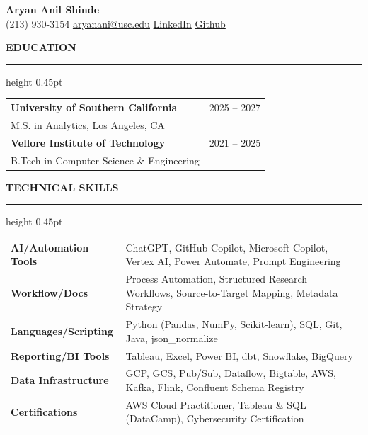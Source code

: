 \documentclass[10pt,letterpaper]{article}
\newcommand{\ressection}[1]{%
  \vspace{2.5pt}
  {\color{sectionblue}\bfseries\MakeUppercase{#1}}\par
  \vspace{1pt}
  {\color{sectionblue}\hrule height 0.45pt}
  \vspace{2pt}
}
\begin{document}
\fontsize{9.05pt}{9.8pt}\selectfont

\begin{center}
  {\fontsize{14.4pt}{15pt}\selectfont \color{sectionblue}\textbf{Aryan Anil Shinde}}\\[-1pt]
  (213) 930-3154 \quad\textbar\quad
  \href{mailto:aryanani@usc.edu}{aryanani@usc.edu} \quad\textbar\quad
  \href{https://linkedin.com/in/aryananilshinde13}{LinkedIn} \quad\textbar\quad
  \href{https://github.com/lefthral}{Github}
\end{center}

\vspace{-5pt}

\ressection{Education}
\begin{tabularx}{\textwidth}{@{}Xr@{}}
  \textbf{University of Southern California} & 2025 -- 2027 \\
  M.S. in Analytics, Los Angeles, CA & \\
  \textbf{Vellore Institute of Technology} & 2021 -- 2025 \\
  B.Tech in Computer Science \& Engineering & \\
\end{tabularx}

\ressection{Technical Skills}
\begin{tabularx}{\textwidth}{@{}>{\bfseries}p{1.55in}X@{}}
AI/Automation Tools & ChatGPT, GitHub Copilot, Microsoft Copilot, Vertex AI, Power Automate, Prompt Engineering \\
Workflow/Docs & Process Automation, Structured Research Workflows, Source-to-Target Mapping, Metadata Strategy \\
Languages/Scripting & Python (Pandas, NumPy, Scikit-learn), SQL, Git, Java, json\_normalize \\
Reporting/BI Tools & Tableau, Excel, Power BI, dbt, Snowflake, BigQuery \\
Data Infrastructure & GCP, GCS, Pub/Sub, Dataflow, Bigtable, AWS, Kafka, Flink, Confluent Schema Registry \\
Certifications & AWS Cloud Practitioner, Tableau \& SQL (DataCamp), Cybersecurity Certification \\
\end{tabularx}
\end{document}
